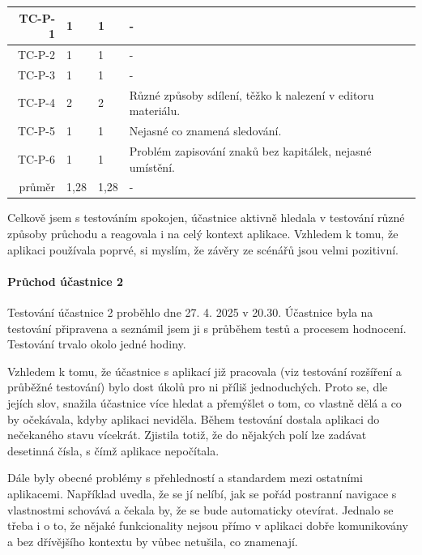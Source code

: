 \begin{longtable}{r|p{2cm}|p{2cm}|p{6cm}}
TC-P-1   & 1 & 1 & - \\\hline
TC-P-2   & 1 & 1 & - \\\hline
TC-P-3   & 1 & 1 & - \\\hline
TC-P-4   & 2 & 2 & Různé způsoby sdílení, těžko k nalezení v editoru materiálu. \\\hline
TC-P-5   & 1 & 1 & Nejasné co znamená sledování. \\\hline
TC-P-6   & 1 & 1 & Problém zapisování znaků bez kapitálek, nejasné umístění. \\\hline\hline
průměr   & 1,28 & 1,28 & - \\
\end{longtable}

Celkově jsem s testováním spokojen, účastnice aktivně hledala v testování různé způsoby průchodu a reagovala i na celý kontext aplikace.
Vzhledem k tomu, že aplikaci používala poprvé, si myslím, že závěry ze scénářů jsou velmi pozitivní.




\paragraph{Průchod účastnice 2}

Testování účastnice 2 proběhlo dne 27. 4. 2025 v 20.30. 
Účastnice byla na testování připravena a seznámil jsem ji s průběhem testů a procesem hodnocení. 
Testování trvalo okolo jedné hodiny.

Vzhledem k tomu, že účastnice s aplikací již pracovala (viz testování rozšíření a průběžné testování) bylo dost úkolů pro ni příliš jednoduchých. 
Proto se, dle jejích slov, snažila účastnice více hledat a přemýšlet o tom, co vlastně dělá a co by očekávala, kdyby aplikaci neviděla.
Během testování dostala aplikaci do nečekaného stavu vícekrát.
Zjistila totiž, že do nějakých polí lze zadávat desetinná čísla, s čímž aplikace nepočítala.

Dále byly obecné problémy s přehledností a standardem mezi ostatními aplikacemi.
Například uvedla, že se jí nelíbí, jak se pořád postranní navigace s vlastnostmi schovává a čekala by, že se bude automaticky otevírat. 
Jednalo se třeba i o to, že nějaké funkcionality nejsou přímo v aplikaci dobře komunikovány a bez dřívějšího kontextu by vůbec netušila, co znamenají.

